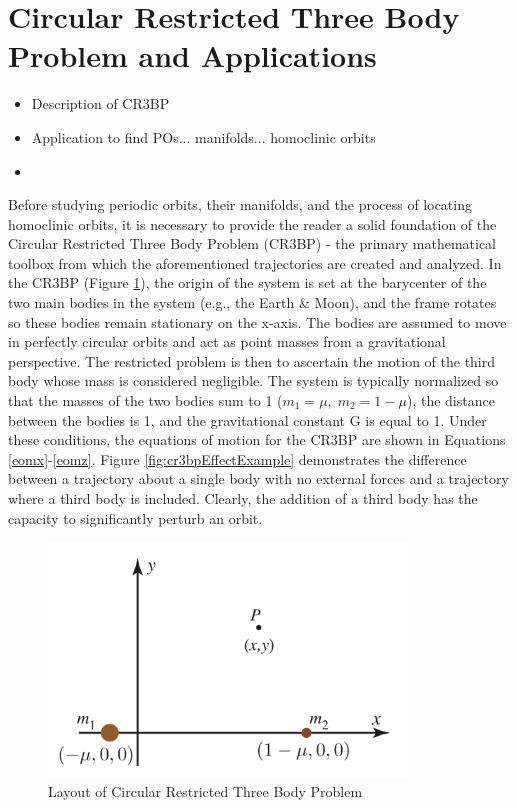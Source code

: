 \documentclass[11pt]{article} %
\begin{document}
\section*{Circular Restricted Three Body Problem and Applications}
\begin{itemize}
	\item \color{red}Description of CR3BP
	\item Application to find POs... manifolds... homoclinic orbits
	\item \color{black}
\end{itemize}
Before studying periodic orbits, their manifolds, and the process of locating homoclinic orbits, it is necessary to provide the reader a solid foundation of the Circular Restricted Three Body Problem (CR3BP) - the primary mathematical toolbox from which the aforementioned trajectories are created and analyzed. In the CR3BP (Figure \ref{fig:CR3BP}), the origin of the system is set at the barycenter of the two main bodies in the system (e.g., the Earth \& Moon), and the frame rotates so these bodies remain stationary on the x-axis. The bodies are assumed to move in perfectly circular orbits and act as point masses from a gravitational perspective. The restricted problem is then to ascertain the motion of the third body whose mass is considered negligible. The system is typically normalized so that the masses of the two bodies sum to 1 ($m_1 = \mu,\; m_2 = 1-\mu$), the distance between the bodies is 1, and the gravitational constant G is equal to 1. Under these conditions, the equations of motion for the CR3BP are shown in Equations \ref{eomx}-\ref{eomz}. Figure \ref{fig:cr3bpEffectExample} demonstrates the difference between a trajectory about a single body with no external forces and a trajectory where a third body is included. Clearly, the addition of a third body has the capacity to significantly perturb an orbit. 

\begin{figure}[H]
\centering
\includegraphics[width=3.75in]{CR3BP.png}
\caption{Layout of Circular Restricted Three Body Problem \cite{KoonLoMarsdenRoss2011}}
\label{fig:CR3BP}
\end{figure}
\end{document}
